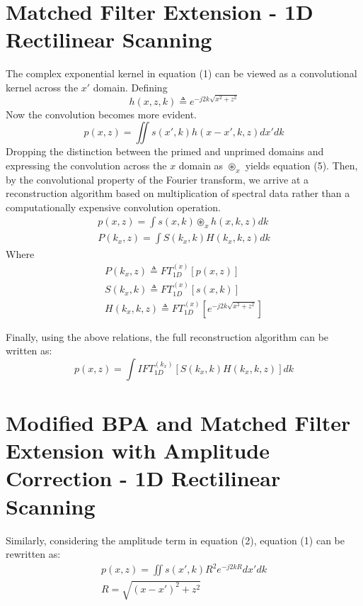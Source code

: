 \documentclass[conference]{IEEEtran}
\begin{document}
\section{Matched Filter Extension - 1D Rectilinear Scanning}
The complex exponential kernel in equation (1) can be viewed as a convolutional kernel across the $x'$ domain. Defining
\begin{equation}
	h(x,z,k) \triangleq e^{-j2k\sqrt{ x^2 + z^2 }}
\end{equation}
Now the convolution becomes more evident.
\begin{equation}
	p(x,z) = \iint s(x',k)h(x-x',k,z) dx'dk
\end{equation}
Dropping the distinction between the primed and unprimed domains and expressing the convolution across the $x$ domain as $\circledast_x$ yields equation (5). Then, by the convolutional property of the Fourier transform, we arrive at a reconstruction algorithm based on multiplication of spectral data rather than a computationally expensive convolution operation.
\begin{gather}
	p(x,z) = \int s(x,k) \circledast_x h(x,k,z)dk \\
	P(k_x,z) = \int S(k_x,k)H(k_x,k,z)dk
\end{gather}
Where 
\begin{gather}
	P(k_x,z) \triangleq FT_{1D}^{(x)}\left[p(x,z)\right] \\
	S(k_x,k) \triangleq FT_{1D}^{(x)}\left[s(x,k)\right] \\
	H(k_x,k,z) \triangleq FT_{1D}^{(x)}\left[e^{-j2k\sqrt{ x^2 + z^2 }}\right]
\end{gather}

Finally, using the above relations, the full reconstruction algorithm can be written as:
\begin{equation}
	p(x,z) = \int IFT_{1D}^{(k_x)}\left[S(k_x,k)H(k_x,k,z)\right]dk
\end{equation}

\section{Modified BPA and Matched Filter Extension with Amplitude Correction - 1D Rectilinear Scanning}

Similarly, considering the amplitude term in equation (2), equation (1) can be rewritten as:
\begin{gather}
	p(x,z) = \iint s(x',k)R^2 e^{-j2kR}dx'dk \\
	R = \sqrt{(x-x')^2+z^2}
\end{gather}
\end{document}
